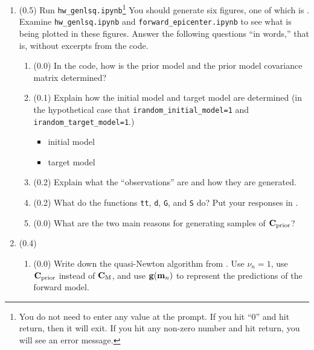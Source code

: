\documentclass[11pt,titlepage,fleqn]{article}
\begin{document}
\clearpage\pagebreak
\begin{enumerate}
\item (0.5)
Run \verb+hw_genlsq.ipynb+\footnote{You do not need to enter any value at the prompt. If you hit ``0'' and hit return, then it will exit. If you hit any non-zero number and hit return, you will see an error message.} You should generate six figures, one of which is . Examine \verb+hw_genlsq.ipynb+ and \verb+forward_epicenter.ipynb+ to see what is being plotted in these figures. Answer the following questions ``in words,'' that is, without excerpts from the code.

\begin{enumerate}
\item (0.0) In the code, how is the prior model and the prior model covariance matrix determined?

\vspace{1cm}

\item (0.1) Explain how the initial model and target model are determined (in the hypothetical case that \verb+irandom_initial_model=1+ and \verb+irandom_target_model=1+.)

\begin{itemize}
\item initial model
\item target model
\end{itemize}

\item (0.2) Explain what the ``observations'' are and how they are generated.

\vspace{1cm}

\item (0.2) What do the functions \verb+tt+, \verb+d+, \verb+G+, and \verb+S+ do? Put your responses in .

\item (0.0) What are the two main reasons for generating samples of $\mbox{${\bf C}$}_{\rm prior}$?

\vspace{1cm}

\end{enumerate}



\item (0.4) 

\begin{enumerate}
\item (0.0) Write down the quasi-Newton algorithm from \citet[][Eq.~6.319]{Tarantola2005}. Use $\nu_n = 1$, use $\mbox{${\bf C}$}_{\rm prior}$ instead of $\mbox{${\bf C}$}_{\rm M}$, and use $\mbox{${\bf g}$}(\mbox{${\bf m}$}_n)$ to represent the predictions of the forward model.


\end{enumerate}
\end{enumerate}
\end{document}
